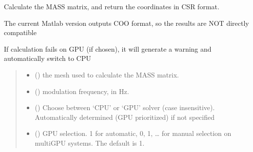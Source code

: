 \documentclass[letterpaper,10pt,english]{sphinxmanual}
\begin{document}
\begin{fulllineitems}
\label{\detokenize{_autosummary/nirfasterff.math.gen_mass_matrix:nirfasterff.math.gen_mass_matrix}}
\pysigstartsignatures
{}
\pysigstopsignatures
\sphinxAtStartPar
Calculate the MASS matrix, and return the coordinates in CSR format.

\sphinxAtStartPar
The current Matlab version outputs COO format, so the results are NOT directly compatible

\sphinxAtStartPar
If calculation fails on GPU (if chosen), it will generate a warning and automatically switch to CPU
\begin{quote}\begin{description}
\begin{itemize}
\item {} 
\sphinxAtStartPar
{} () \textendash{} the mesh used to calculate the MASS matrix.

\item {} 
\sphinxAtStartPar
{} () \textendash{} modulation frequency, in Hz.

\item {} 
\sphinxAtStartPar
{} (\sphinxstyleliteralemphasis{\sphinxupquote{, }}) \textendash{} Choose between ‘CPU’ or ‘GPU’ solver (case insensitive). Automatically determined (GPU prioritized) if not specified

\item {} 
\sphinxAtStartPar
{} (\sphinxstyleliteralemphasis{\sphinxupquote{, }}) \textendash{} GPU selection. \sphinxhyphen{}1 for automatic, 0, 1, … for manual selection on multi\sphinxhyphen{}GPU systems. The default is \sphinxhyphen{}1.


\end{itemize}
\end{description}
\end{quote}
\end{fulllineitems}
\end{document}
